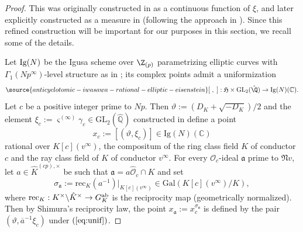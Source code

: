 \begin{proof}
This was originally constructed in \cite{BDP} as a continuous function of $\xi$, and later explicitly constructed as a measure in \cite{cas-hsieh1} (following the approach in \cite{brakocevic}). Since this refined construction will be important for our purposes in this section, we recall some of the details.

Let ${\rm Ig}(N)$ be the Igusa scheme over $\Z_{(p)}$ parametrizing elliptic curves with $\Gamma_1(Np^\infty)$-level structure as in \cite[\S{2.1}]{cas-hsieh1};  its complex points admit a uniformization
\begin{equation}\label{eq:unif}
\source{anticyclotomic-iwasawa-rational-elliptic-eisenstein}
[\;,\;]:\mathfrak{H}\times{\rm GL}_2(\hat{\Q})\rightarrow{\rm Ig}(N)(\mathbb{C}).
\end{equation}
Let $c$ be a positive integer prime to $Np$. Then $\vartheta:=(D_K+\sqrt{-D_K})/2$ and the element $\xi_c:=\varsigma^{(\infty)}\gamma_c\in\mathrm{GL}_2(\hat{\mathbb{Q}}^{})$ constructed in \cite[p.~577]{cas-hsieh1} define a point
\[
x_c:=[(\vartheta,\xi_c)]\in\mathrm{Ig}(N)(\mathbb{C})
\]
rational over $K[c](v^\infty)$, the compositum of the ring class field $K$ of conductor $c$ and the ray class field of $K$ of conductor $v^\infty$. For every $\mathcal{O}_c$-ideal $\mathfrak{a}$ prime to $\mathfrak{N}v$, let $a\in\hat{K}^{(cp),\times}$ be such that $\mathfrak{a}=a\hat{\mathcal{O}}_c\cap K$ and set
\[
\sigma_\mathfrak{a}:=\mathrm{rec}_K(a^{-1})\vert_{K[c](v^\infty)}\in\mathrm{Gal}(K[c](v^\infty)/K),
\]
where ${\rm rec}_K:K^\times\backslash\hat{K}^\times\rightarrow G_K^{\rm ab}$ is the reciprocity map (geometrically normalized). Then by Shimura's reciprocity law, the point $x_\mathfrak{a}:=x_c^{\sigma_\mathfrak{a}}$ is defined by the pair $(\vartheta,\overline{a}^{-1}\xi_c)$ under $(\ref{eq:unif})$.


\end{proof}
